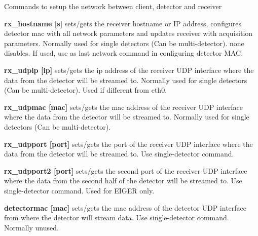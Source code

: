 Commands to setup the network between client, detector and receiver
\begin{DoxyItemize}
\item {\bfseries rx\_\-hostname \mbox{[}s\mbox{]}} sets/gets the receiver hostname or IP address, configures detector mac with all network parameters and updates receiver with acquisition parameters. Normally used for single detectors (Can be multi-\/detector). {\ttfamily none} disables. If used, use as last network command in configuring detector MAC.
\end{DoxyItemize}


\begin{DoxyItemize}
\item {\bfseries rx\_\-udpip \mbox{[}ip\mbox{]}} sets/gets the ip address of the receiver UDP interface where the data from the detector will be streamed to. Normally used for single detectors (Can be multi-\/detector). Used if different from eth0.
\end{DoxyItemize}


\begin{DoxyItemize}
\item {\bfseries rx\_\-udpmac \mbox{[}mac\mbox{]}} sets/gets the mac address of the receiver UDP interface where the data from the detector will be streamed to. Normally used for single detectors (Can be multi-\/detector).
\end{DoxyItemize}


\begin{DoxyItemize}
\item {\bfseries rx\_\-udpport \mbox{[}port\mbox{]}} sets/gets the port of the receiver UDP interface where the data from the detector will be streamed to. Use single-\/detector command.
\end{DoxyItemize}


\begin{DoxyItemize}
\item {\bfseries rx\_\-udpport2 \mbox{[}port\mbox{]}} sets/gets the second port of the receiver UDP interface where the data from the second half of the detector will be streamed to. Use single-\/detector command. Used for EIGER only.
\end{DoxyItemize}


\begin{DoxyItemize}
\item {\bfseries detectormac \mbox{[}mac\mbox{]}} sets/gets the mac address of the detector UDP interface from where the detector will stream data. Use single-\/detector command. Normally unused.
\end{DoxyItemize}


